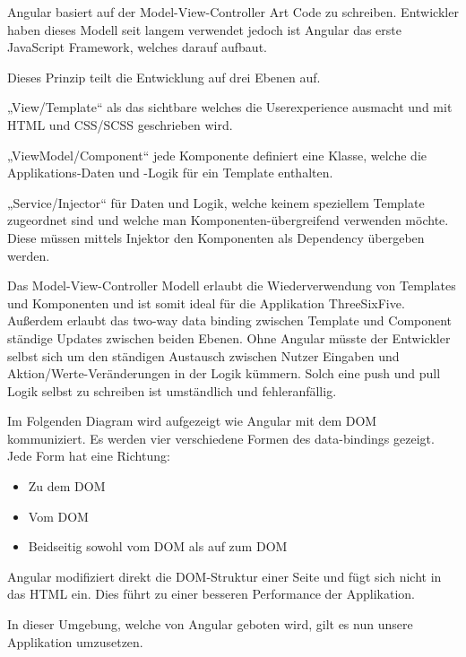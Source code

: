 Angular basiert auf der Model-View-Controller Art Code zu schreiben. Entwickler haben dieses Modell seit langem verwendet jedoch ist Angular das erste JavaScript Framework, welches darauf aufbaut.

Dieses Prinzip teilt die Entwicklung auf drei Ebenen auf.

„View/Template“ als das sichtbare welches die Userexperience ausmacht und mit HTML und CSS/SCSS geschrieben wird.

„ViewModel/Component“ jede Komponente definiert eine Klasse, welche die Applikations-Daten und -Logik für ein Template enthalten.

„Service/Injector“ für Daten und Logik, welche keinem speziellem Template zugeordnet sind und welche man Komponenten-übergreifend verwenden möchte. Diese müssen mittels Injektor den Komponenten als Dependency übergeben werden.

Das Model-View-Controller Modell erlaubt die Wiederverwendung von Templates und Komponenten und ist somit ideal für die Applikation ThreeSixFive. Außerdem erlaubt das two-way data binding zwischen Template und Component ständige Updates zwischen beiden Ebenen. Ohne Angular müsste der Entwickler selbst sich um den ständigen Austausch zwischen Nutzer Eingaben und Aktion/Werte-Veränderungen in der Logik kümmern. Solch eine push und pull Logik selbst zu schreiben ist umständlich und fehleranfällig.

Im Folgenden Diagram wird aufgezeigt wie Angular mit dem DOM kommuniziert.
Es werden vier verschiedene Formen des data-bindings gezeigt. Jede Form hat eine Richtung:
\begin{itemize}
\item Zu dem DOM
\item Vom DOM
\item Beidseitig sowohl vom DOM als auf zum DOM
\end{itemize}

Angular modifiziert direkt die DOM-Struktur einer Seite und fügt sich nicht in das HTML ein. Dies führt zu einer besseren Performance der Applikation.

In dieser Umgebung, welche von Angular geboten wird, gilt es nun unsere Applikation umzusetzen.
